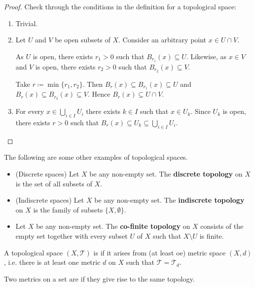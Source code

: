 \begin{proof}
Check through the conditions in the definition for a topological space:
\begin{enumerate}[label=(\arabic*)]
\item Trivial.
\item Let $U$ and $V$ be open subsets of $X$. Consider an arbitrary point $x\in U\cap V$.

As $U$ is open, there exists $r_1>0$ such that $B_{r_1}(x)\subseteq U$. Likewise, as $x\in V$ and $V$ is open, there exists $r_2>0$ such that $B_{r_2}(x)\subseteq V$.

Take $r\coloneqq\min\{r_1,r_2\}$. Then $B_r(x)\subseteq B_{r_1}(x)\subseteq U$ and $B_r(x)\subseteq B_{r_2}(x)\subseteq V$. Hence $B_r(x)\subseteq U\cap V$.

\item For every $x\in\bigcup_{i\in I}U_i$ there exists $k\in I$ such that $x\in U_k$. Since $U_k$ is open, there exists $r>0$ such that $B_r(x)\subseteq U_k\subseteq\bigcup_{i\in I}U_i$.
\end{enumerate}
\end{proof}

\begin{example}
The following are some other examples of topological spaces.
\begin{itemize}
\item (Discrete spaces) Let $X$ be any non-empty set. The \textbf{discrete topology} on $X$ is
the set of all subsets of $X$.
\item (Indiscrete spaces) Let $X$ be any non-empty set. The \textbf{indiscrete topology} on $X$ is the family of subsets $\{X,\emptyset\}$.
\item Let $X$ be any non-empty set. The \textbf{co-finite topology} on $X$ consists of the empty set together with every subset $U$ of $X$ such that $X\setminus U$ is finite.
\end{itemize}
\end{example}

\begin{definition}
A topological space $(X,\mathcal{T})$ is  if it arises from (at least oe) metric space $(X,d)$, i.e. there is at least one metric $d$ on $X$ such that $\mathcal{T}=\mathcal{T}_d$.
\end{definition}

\begin{definition}
Two metrics on a set are  if they give rise to the same topology.
\end{definition}

